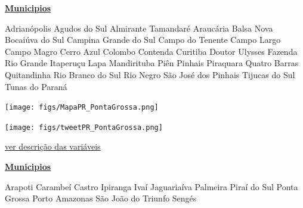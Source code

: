 \documentclass[10pt]{article} %
\begin{document}
\begin{minipage}[t]{.30\linewidth}
\begin{mdframed}[style=sidebar,frametitle={}]
\textbf{\hyperlink{municips}{Municipios}}\begin{itemize}\gsquare Adrianópolis 
\gsquare Agudos do Sul 
\gsquare Almirante Tamandaré 
\gsquare Araucária 
\gsquare Balsa Nova 
\gsquare Bocaiúva do Sul 
\gsquare Campina Grande do Sul 
\gsquare Campo do Tenente 
\gsquare Campo Largo 
\gsquare Campo Magro 
\gsquare Cerro Azul 
\gsquare Colombo 
\gsquare Contenda 
\gsquare Curitiba 
\gsquare Doutor Ulysses 
\gsquare Fazenda Rio Grande 
\gsquare Itaperuçu 
\gsquare Lapa 
\gsquare Mandirituba 
\gsquare Piên 
\gsquare Pinhais 
\gsquare Piraquara 
\gsquare Quatro Barras 
\gsquare Quitandinha 
\gsquare Rio Branco do Sul 
\gsquare Rio Negro 
\gsquare São José dos Pinhais 
\gsquare Tijucas do Sul 
\gsquare Tunas do Paraná 
\end{itemize}\BackToContents\end{mdframed}\hfill\end{minipage}\newpage\begin{minipage}[t]{.66\linewidth}
\hypertarget{PntG}{}
\texttt{[image: figs/MapaPR\_PontaGrossa.png]}\vspace{0.5cm}\vspace{0.5cm}\begin{center}
\texttt{[image: figs/tweetPR\_PontaGrossa.png]}\end{center}
\begin{center}

\end{center}
\small{\hyperlink{vartab}{ver descrição das variáveis}}\end{minipage}\hfill\begin{minipage}[t]{.30\linewidth}
\begin{mdframed}[style=sidebar,frametitle={}]
\textbf{\hyperlink{municips}{Municipios}}\begin{itemize}\gsquare Arapoti 
\gsquare Carambeí 
\gsquare Castro 
\gsquare Ipiranga 
\gsquare Ivaí 
\gsquare Jaguariaíva 
\gsquare Palmeira 
\gsquare Piraí do Sul 
\gsquare Ponta Grossa 
\gsquare Porto Amazonas 
\gsquare São João do Triunfo 
\gsquare Sengés 
\end{itemize}\BackToContents\end{mdframed}\hfill\end{minipage}\newpage\begin{minipage}[t]{.66\linewidth}

\end{minipage}
\end{document}
